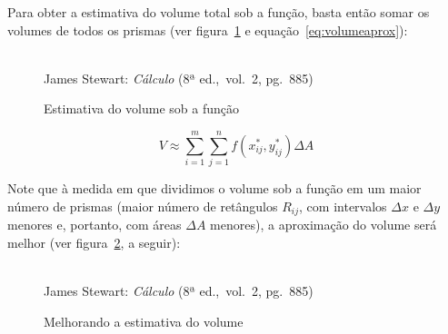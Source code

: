 Para obter a estimativa do volume total sob a função, basta então
somar os volumes de todos os prismas (ver figura~\ref{fig:volume3}
e equação~\ref{eq:volumeaprox}):

\begin{figure}[H]
  \begin{center}
    \caption{Estimativa do volume sob a função}
    \label{fig:volume3}
    \\
    \footnotesize{James Stewart: \emph{Cálculo} (8ª ed.,\ vol.\ 2,
      pg.\ 885)}
  \end{center}
\end{figure}

\begin{equation}
  \label{eq:volumeaprox}
  V \approx \sum_{i=1}^m \sum_{j=1}^n f(x_{ij}^*, y_{ij}^*) \Delta A
\end{equation}

Note que à medida em que dividimos o volume sob a função em um maior
número de prismas (maior número de retângulos $R_{ij}$, com intervalos
$\Delta x$ e $\Delta y$ menores e, portanto, com áreas $\Delta A$
menores), a aproximação do volume será melhor (ver
figura~\ref{fig:volume4}, a seguir):

\begin{figure}[H]
  \begin{center}
    \caption{Melhorando a estimativa do volume}
    \label{fig:volume4}
    \\
    \footnotesize{James Stewart: \emph{Cálculo} (8ª ed.,\ vol.\ 2,
      pg.\ 885)}
  \end{center}
\end{figure}

